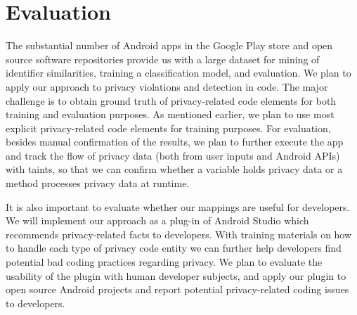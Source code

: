 \section{Evaluation}

The substantial number of Android apps in the Google Play store and open source software repositories provide us with a large dataset for mining of identifier similarities, training a classification model, and evaluation. We plan to apply our approach to privacy violations and detection in code. The major challenge is to obtain ground truth of privacy-related code elements for both training and evaluation purposes. As mentioned earlier, we plan to use most explicit privacy-related code elements for training purposes. For evaluation, besides manual confirmation of the results, we plan to further execute the app and track the flow of privacy data (both from user inputs and Android APIs) with taints, so that we can confirm whether a variable holds privacy data or a method processes privacy data at runtime.

It is also important to evaluate whether our mappings are useful for developers. We will implement our approach as a plug-in of Android Studio which recommends privacy-related facts to developers. With training materials on how to handle each type of privacy code entity we can further help developers find potential bad coding practices regarding privacy. We plan to evaluate the usability of the plugin with human developer subjects, and apply our plugin to open source Android projects and report potential privacy-related coding issues to developers.
